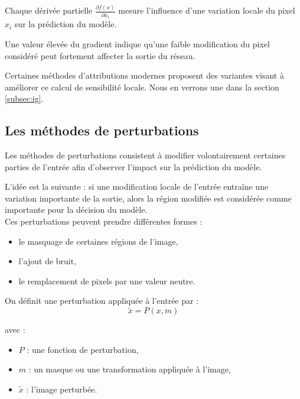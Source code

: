 \documentclass{ir}
\begin{document}
Chaque dérivée partielle $\frac{\partial f(x)}{\partial x_i}$ mesure l'influence d'une variation locale du pixel $x_i$ sur la prédiction du modèle.

Une valeur élevée du gradient indique qu'une faible modification du pixel considéré peut fortement affecter la sortie du réseau.
\cite{simonyan2013saliency} \newline

Certaines méthodes d'attributions modernes proposent des variantes visant à améliorer ce calcul de sensibilité locale. Nous en verrons une dans la section \ref{subsec:ig}.

\subsection{Les méthodes de perturbations}\label{subsec:perturbations}

Les méthodes de perturbations consistent à modifier volontairement certaines parties de l'entrée afin d'observer l'impact sur la prédiction du modèle.

L'idée est la suivante : si une modification locale de l'entrée entraîne une variation importante de la sortie, alors la région modifiée est considérée comme importante pour la décision du modèle.\\

Ces perturbations peuvent prendre différentes formes :
\begin{itemize}
    \item le masquage de certaines régions de l'image,
    \item l'ajout de bruit,
    \item le remplacement de pixels par une valeur neutre.\\
\end{itemize}

On définit une perturbation appliquée à l'entrée par :
\begin{equation}
\tilde{x} = P(x, m)
\end{equation}

avec :
\begin{itemize}
    \item $P$ : une fonction de perturbation,
    \item $m$ : un masque ou une transformation appliquée à l'image,
    \item $\tilde{x}$ : l'image perturbée.\\
\end{itemize}
\end{document}
